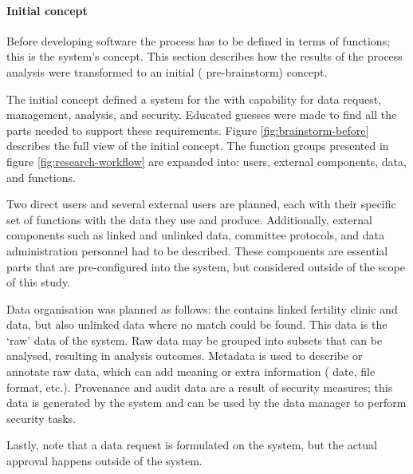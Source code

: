 \paragraph{Initial concept}
Before developing software the process has to be defined in terms of functions; this is the system's concept.
This section describes how the results of the process analysis were transformed to an initial (\ie{} pre-brainstorm) concept.

The initial concept defined a system for the \projectdata{} with capability for data request, management, analysis, and security.
Educated guesses were made to find all the parts needed to support these requirements.
Figure \ref{fig:brainstorm-before} describes the full view of the initial concept. 
The function groups presented in figure \ref{fig:research-workflow} are expanded into: users, external components, data, and functions.

Two direct users and several external users are planned, each with their specific set of functions with the data they use and produce.
Additionally, external components such as linked and unlinked data, committee protocols, and data administration personnel had to be described.
These components are essential parts that are pre-configured into the system, but considered outside of the scope of this study.

Data organisation was planned as follows: the \projectdata{} contains linked fertility clinic and \PRN{} data, but also unlinked data where no match could be found.
This data is the `raw' data of the system.
Raw data may be grouped into subsets that can be analysed, resulting in analysis outcomes.
Metadata is used to describe or annotate raw data, which can add meaning or extra information (\eg{} date, file format, etc.).
Provenance and audit data are a result of security measures; this data is generated by the system and can be used by the data manager to perform security tasks.

Lastly, note that a data request is formulated on the system, but the actual approval happens outside of the system.

